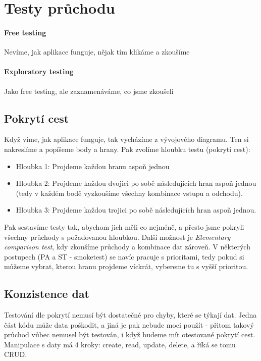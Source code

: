 \section{Testy průchodu}

\paragraph{Free testing} Nevíme, jak aplikace funguje, nějak tím klikáme a zkoušíme

\paragraph{Exploratory testing} Jako free testing, ale zaznamenáváme, co jsme zkoušeli

\subsection{Pokrytí cest}

Když víme, jak aplikace funguje, tak vycházíme z vývojového diagramu. Ten si nakreslíme a popíšeme body a hrany. Pak zvolíme hloubku testu (pokrytí cest):

\begin{itemize}
\item Hloubka 1: Projdeme každou hranu aspoň jednou
\item Hloubka 2: Projdeme každou dvojici po sobě následujících hran aspoň jednou (tedy v každém bodě vyzkoušíme všechny kombinace vstupu a odchodu).
\item Hloubka 3: Projdeme každou trojici po sobě následujících hran aspoň jednou.
\end{itemize}

Pak sestavíme testy tak, abychom jich měli co nejméně, a přesto jsme pokryli všechny průchody s požadovanou hloubkou. Další možnost je \textit{Elementary comparison test}, kdy zkoušíme průchody a kombinace dat zároveň. V některých postupech (PA a ST - smoketest) se navíc pracuje s prioritami, tedy pokud si můžeme vybrat, kterou hranu projdeme víckrát, vybereme tu s vyšší prioritou.

\subsection{Konzistence dat}

Testování dle pokrytí nemusí být dostatečné pro chyby, které se týkají dat. Jedna část kódu může data poškodit, a jiná je pak nebude moci použít - přitom takový průchod vůbec nemusel být testován, i když budeme mít otestované pokrytí cest. Manipulace s daty má 4 kroky: create, read, update, delete, a říká se tomu CRUD.

